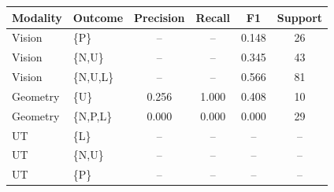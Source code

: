 \begin{tabular}{llcccc}
\toprule
Modality & Outcome & Precision & Recall & F1 & Support \\
\midrule
Vision & \{P\} & -- & -- & 0.148 & 26 \\
Vision & \{N,U\} & -- & -- & 0.345 & 43 \\
Vision & \{N,U,L\} & -- & -- & 0.566 & 81 \\
Geometry & \{U\} & 0.256 & 1.000 & 0.408 & 10 \\
Geometry & \{N,P,L\} & 0.000 & 0.000 & 0.000 & 29 \\
UT & \{L\} & -- & -- & -- & -- \\
UT & \{N,U\} & -- & -- & -- & -- \\
UT & \{P\} & -- & -- & -- & -- \\
\bottomrule
\end{tabular}